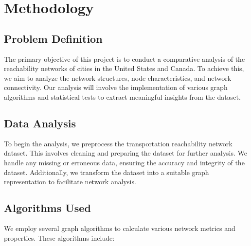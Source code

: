 
\section{Methodology}


\subsection{Problem Definition}

The primary objective of this project is to conduct a comparative analysis of the reachability networks of cities in the United States and Canada. To achieve this, we aim to analyze the network structures, node characteristics, and network connectivity. Our analysis will involve the implementation of various graph algorithms and statistical tests to extract meaningful insights from the dataset.

\subsection{Data Analysis}

To begin the analysis, we preprocess the transportation reachability network dataset. This involves cleaning and preparing the dataset for further analysis. We handle any missing or erroneous data, ensuring the accuracy and integrity of the dataset. Additionally, we transform the dataset into a suitable graph representation to facilitate network analysis.

\subsection{Algorithms Used}

We employ several graph algorithms to calculate various network metrics and properties. These algorithms include:

